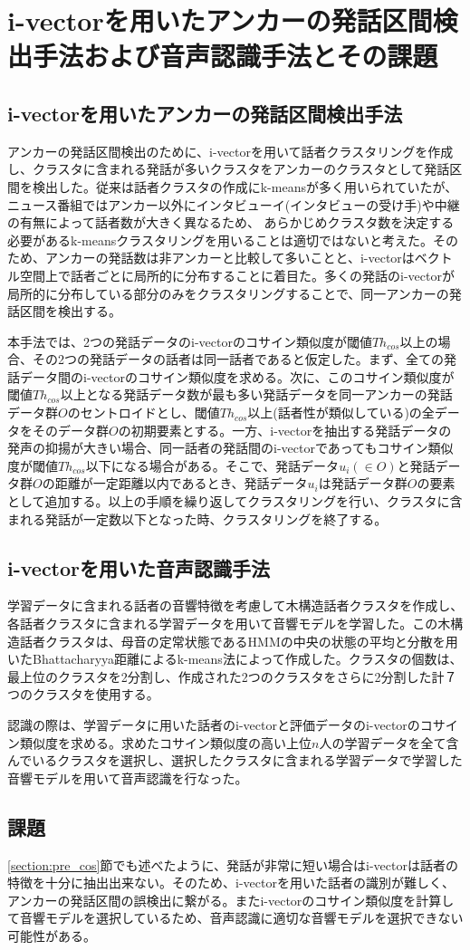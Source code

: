 \chapter{i-vectorを用いたアンカーの発話区間検出手法および音声認識手法とその課題}

\section{i-vectorを用いたアンカーの発話区間検出手法\cite{nozaki_gakuseikai}}
\label{section:clustering}
アンカーの発話区間検出のために、i-vectorを用いて話者クラスタリングを作成し、クラスタに含まれる発話が多いクラスタをアンカーのクラスタとして発話区間を検出した。従来は話者クラスタの作成にk-meansが多く用いられていたが、ニュース番組ではアンカー以外にインタビューイ(インタビューの受け手)や中継の有無によって話者数が大きく異なるため、
あらかじめクラスタ数を決定する必要があるk-meansクラスタリングを用いることは適切ではないと考えた。そのため、アンカーの発話数は非アンカーと比較して多いことと、i-vectorはベクトル空間上で話者ごとに局所的に分布することに着目た。多くの発話のi-vectorが局所的に分布している部分のみをクラスタリングすることで、同一アンカーの発話区間を検出する。\par
本手法では、2つの発話データのi-vectorのコサイン類似度が閾値$Th_{cos}$以上の場合、その2つの発話データの話者は同一話者であると仮定した。まず、全ての発話データ間のi-vectorのコサイン類似度を求める。次に、このコサイン類似度が閾値$Th_{cos}$以上となる発話データ数が最も多い発話データを同一アンカーの発話データ群$O$のセントロイドとし、閾値$Th_{cos}$以上(話者性が類似している)の全データをそのデータ群$O$の初期要素とする。一方、i-vectorを抽出する発話データの発声の抑揚が大きい場合、同一話者の発話間のi-vectorであってもコサイン類似度が閾値$Th_{cos}$以下になる場合がある。そこで、発話データ$u_i(\in O)$と発話データ群$O$の距離が一定距離以内であるとき、発話データ$u_i$は発話データ群$O$の要素として追加する。以上の手順を繰り返してクラスタリングを行い、クラスタに含まれる発話が一定数以下となった時、クラスタリングを終了する。\par

\section{i-vectorを用いた音声認識手法\cite{yoshimura_clustering}}
\label{section:yoshimura_pre_clustering}
学習データに含まれる話者の音響特徴を考慮して木構造話者クラスタを作成し、各話者クラスタに含まれる学習データを用いて音響モデルを学習した。この木構造話者クラスタは、母音の定常状態であるHMMの中央の状態の平均と分散を用いたBhattacharyya距離によるk-means法によって作成した。クラスタの個数は、最上位のクラスタを2分割し、作成された2つのクラスタをさらに2分割した計７つのクラスタを使用する。\par
認識の際は、学習データに用いた話者のi-vectorと評価データのi-vectorのコサイン類似度を求める。求めたコサイン類似度の高い上位$n$人の学習データを全て含んでいるクラスタを選択し、選択したクラスタに含まれる学習データで学習した音響モデルを用いて音声認識を行なった。\par

\section{課題}
\ref{section:pre_cos}節でも述べたように、発話が非常に短い場合はi-vectorは話者の特徴を十分に抽出出来ない。そのため、i-vectorを用いた話者の識別が難しく、アンカーの発話区間の誤検出に繋がる。またi-vectorのコサイン類似度を計算して音響モデルを選択しているため、音声認識に適切な音響モデルを選択できない可能性がある。
